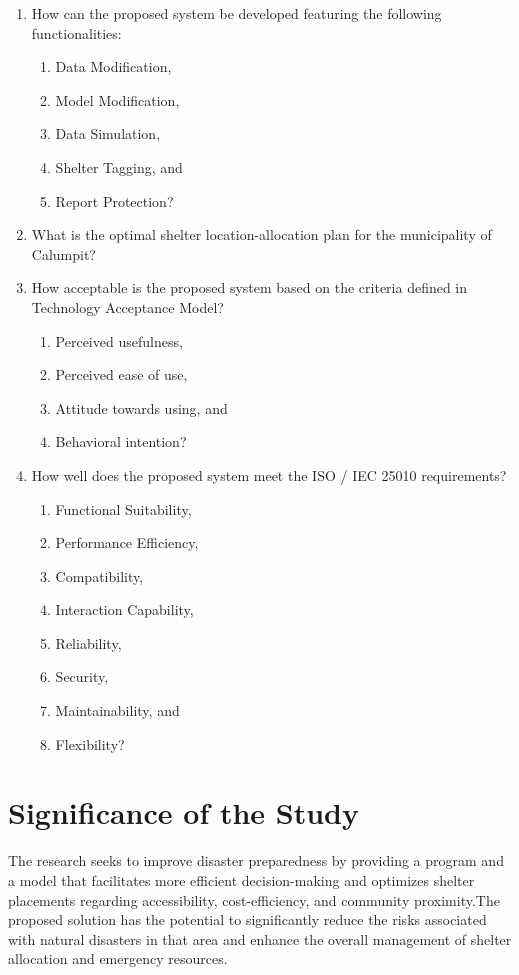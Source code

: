 	\begin{enumerate}
		\item How can the proposed system be developed featuring the following functionalities:
		\begin{enumerate}
			\item Data Modification,
			\item Model Modification,
			\item Data Simulation,
			\item Shelter Tagging, and
			\item Report Protection?
		\end{enumerate}
		\item What is the optimal shelter location-allocation plan for the municipality of Calumpit?
		\item How acceptable is the proposed system based on the criteria defined in Technology Acceptance Model?
		\begin{enumerate}
			\item Perceived usefulness,
			\item Perceived ease of use,
			\item Attitude towards using, and
			\item Behavioral intention?
		\end{enumerate}
		\item How well does the proposed system meet the ISO / IEC 25010 requirements?
		\begin{enumerate}
			\item Functional Suitability,
			\item Performance Efficiency,
			\item Compatibility,
			\item Interaction Capability,
			\item Reliability,
			\item Security,
			\item Maintainability, and
			\item Flexibility?
		\end{enumerate}
	\end{enumerate}
	
\section{Significance of the Study}
	The research seeks to improve disaster preparedness by providing a program and a model that facilitates more efficient decision-making and optimizes shelter placements regarding accessibility, cost-efficiency, and community proximity.The proposed solution has the potential to significantly reduce the risks associated with natural disasters in that area and enhance the overall management of shelter allocation and emergency resources.
	
